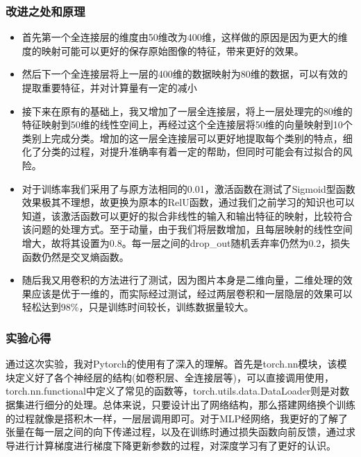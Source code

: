 \documentclass{article}
\begin{document}
\subsubsection{改进之处和原理}
\begin{itemize}
   \item 首先第一个全连接层的维度由50维改为400维，这样做的原因是因为更大的维度的映射可能可以更好的保存原始图像的特征，带来更好的效果。
   \item 然后下一个全连接层将上一层的400维的数据映射为80维的数据，可以有效的提取重要特征，并对计算量有一定的减小
   \item 接下来在原有的基础上，我又增加了一层全连接层，将上一层处理完的80维的特征映射到50维的线性空间上，再经过这个全连接层将50维的向量映射到10个类别上完成分类。增加的这一层全连接层可以更好地提取每个类别的特点，细化了分类的过程，对提升准确率有着一定的帮助，但同时可能会有过拟合的风险。
   \item 对于训练率我们采用了与原方法相同的0.01，激活函数在测试了Sigmoid型函数效果极其不理想，故更换为原本的RelU函数，通过我们之前学习的知识也可以知道，该激活函数可以更好的拟合非线性的输入和输出特征的映射，比较符合该问题的处理方式。至于动量，由于我们将层数增加，且每层映射的线性空间增大，故将其设置为0.8。每一层之间的drop\_out随机丢弃率仍然为0.2，损失函数仍然是交叉熵函数。
   \item 随后我又用卷积的方法进行了测试，因为图片本身是二维向量，二维处理的效果应该是优于一维的，而实际经过测试，经过两层卷积和一层隐层的效果可以轻松达到98\%，只是训练时间较长，训练数据量较大。
\end{itemize}
\subsubsection{实验心得}
通过这次实验，我对Pytorch的使用有了深入的理解。首先是torch.nn模块，该模块定义好了各个神经层的结构(如卷积层、全连接层等)，可以直接调用使用，torch.nn.functional中定义了常见的函数等，torch.utils.data.DataLoader则是对数据集进行细分的处理。总体来说，只要设计出了网络结构，那么搭建网络换个训练的过程就像是搭积木一样，一层层调用即可。对于MLP经网络，我更好的了解了张量在每一层之间的向下传递过程，以及在训练时通过损失函数向前反馈，通过求导进行计算梯度进行梯度下降更新参数的过程，对深度学习有了更好的认识。
\end{document}
